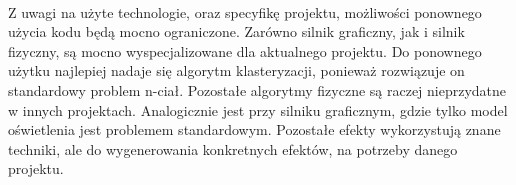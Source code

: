 \paragraph{}

Z uwagi na użyte technologie, oraz specyfikę projektu, możliwości ponownego użycia kodu będą mocno ograniczone. Zarówno silnik graficzny, jak i silnik fizyczny, są mocno wyspecjalizowane dla aktualnego projektu. Do ponownego użytku najlepiej nadaje się algorytm klasteryzacji, ponieważ rozwiązuje on standardowy problem n-ciał. Pozostałe algorytmy fizyczne są raczej nieprzydatne w innych projektach. Analogicznie jest przy silniku graficznym, gdzie tylko model oświetlenia jest problemem standardowym. Pozostałe efekty wykorzystują znane techniki, ale do wygenerowania konkretnych efektów, na potrzeby danego projektu.

